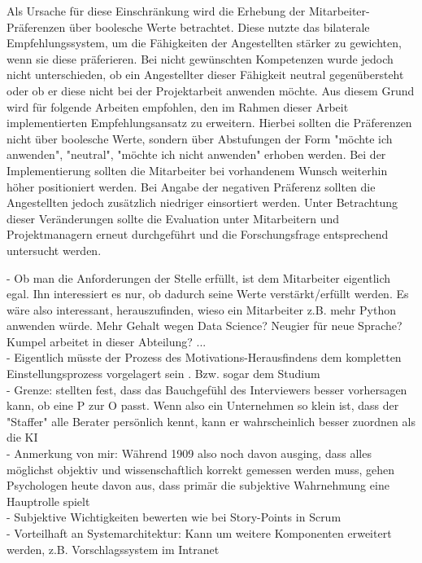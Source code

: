 Als Ursache für diese Einschränkung wird die Erhebung der Mitarbeiter-Präferenzen über boolesche Werte betrachtet. Diese nutzte das bilaterale Empfehlungssystem, um die Fähigkeiten der Angestellten stärker zu gewichten, wenn sie diese präferieren. Bei nicht gewünschten Kompetenzen wurde jedoch nicht unterschieden, ob ein Angestellter dieser Fähigkeit neutral gegenübersteht oder ob er diese nicht bei der Projektarbeit anwenden möchte. Aus diesem Grund wird für folgende Arbeiten empfohlen, den im Rahmen dieser Arbeit implementierten Empfehlungsansatz zu erweitern. Hierbei sollten die Präferenzen nicht über boolesche Werte, sondern über Abstufungen der Form "möchte ich anwenden", "neutral", "möchte ich nicht anwenden" erhoben werden. Bei der Implementierung sollten die Mitarbeiter bei vorhandenem Wunsch weiterhin höher positioniert werden. Bei Angabe der negativen Präferenz sollten die Angestellten jedoch zusätzlich niedriger einsortiert werden. Unter Betrachtung dieser Veränderungen sollte die Evaluation unter Mitarbeitern und Projektmanagern erneut durchgeführt und die Forschungsfrage entsprechend untersucht werden.

\newpage

- Ob man die Anforderungen der Stelle erfüllt, ist dem Mitarbeiter eigentlich egal. Ihn interessiert es nur, ob dadurch seine Werte verstärkt/erfüllt werden. Es wäre also interessant, herauszufinden, wieso ein Mitarbeiter z.B. mehr Python anwenden würde. Mehr Gehalt wegen Data Science? Neugier für neue Sprache? Kumpel arbeitet in dieser Abteilung? ... \\
- Eigentlich müsste der Prozess des Motivations-Herausfindens dem kompletten Einstellungsprozess vorgelagert sein . Bzw. sogar dem Studium \\
- Grenze: \textcite{cable:1997} stellten fest, dass das Bauchgefühl des Interviewers besser vorhersagen kann, ob eine P zur O passt. Wenn also ein Unternehmen so klein ist, dass der "Staffer" alle Berater persönlich kennt, kann er wahrscheinlich besser zuordnen als die KI \\
- Anmerkung von mir: Während \textcite{parsons:1909} 1909 also noch davon ausging, dass alles möglichst objektiv und wissenschaftlich korrekt gemessen werden muss, gehen Psychologen heute davon aus, dass primär die subjektive Wahrnehmung eine Hauptrolle spielt \\
- Subjektive Wichtigkeiten bewerten wie bei Story-Points in Scrum\\
- Vorteilhaft an Systemarchitektur: Kann um weitere Komponenten erweitert werden, z.B. Vorschlagssystem im Intranet

